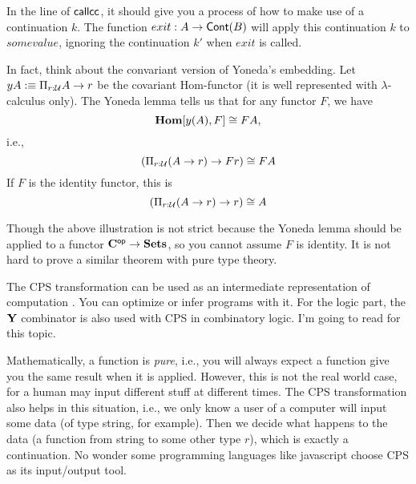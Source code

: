 In the line of $\text{\sf callcc}$, it should give you a process of how to
make use of a continuation $k$. The function $exit: A\to \text{\sf Cont}(B)$
will apply this continuation $k$ to $somevalue$, ignoring the 
continuation $k'$ when $exit$ is called. 

In fact, think about the convariant version of Yoneda's embedding. 
Let $yA:\equiv \Pi_{r:\mathcal{U}}A\to r$ be the covariant 
Hom-functor (it is well represented with $\lambda$-calculus only).
The Yoneda lemma tells us that for any functor $F$, we have 
$$
    \mathbf{Hom}[y(A), F] \cong FA,
$$
i.e.,
$$
    (\Pi_{r:\mathcal{U}}(A\to r) \to Fr)\cong FA
$$
If $F$ is the identity functor, this is
$$
    (\Pi_{r:\mathcal{U}}(A\to r)\to r)\cong A
$$

Though the above illustration is not strict because the Yoneda
lemma should be applied to a functor $\mathbf{C}^{\text{\sf op}}\to\mathbf{Sets}$, so you
cannot assume $F$ is identity. It is not hard to prove a similar
theorem with pure type theory. 

The CPS transformation can be used as an intermediate representation
of computation \cite{appel2007compiling}. You can optimize or infer 
programs with it. For the logic part, the $\mathbf{Y}$ combinator is also 
used with CPS in combinatory logic. I'm going to read \cite{Curry-Howard}
for this topic. 

Mathematically, a function is {\it pure}, i.e., you will always
expect a function give you the same result when it is applied. However,
this is not the real world case, for a human may input different stuff
at different times. The CPS transformation also helps in this situation,
i.e., we only know a user of a computer will input some data (of type
string, for example). Then we decide what happens to the data (a 
function from string to some other type $r$), which is exactly a 
continuation. No wonder some programming languages like javascript
choose CPS as its input/output tool. 
